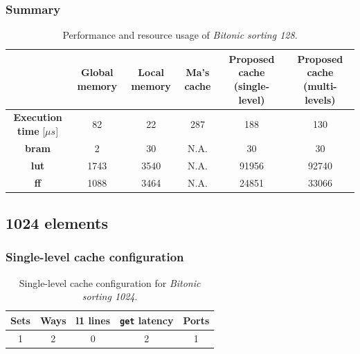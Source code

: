 \documentclass[11pt,a4paper,oneside]{memoir}
\begin{document}
\subsubsection{Summary}
\begin{table}[H]
	\begin{center}
		\begin{tabularx}{\textwidth}{CCCCCC}
			\hline
			& \textbf{Global memory} & \textbf{Local memory} &
			\textbf{Ma's cache} \footnotemark &
			\textbf{Proposed cache (single-level)} &
			\textbf{Proposed cache (multi-levels)} \\
			\hline
			\textbf{Execution time} [$\mu s$] & 82 & 22 & 287 & 188 & 130 \\
			\textbf{\ac{bram}} & 2 & 30 & N.A. & 30 & 30 \\
			\textbf{\acs{lut}} & 1743 & 3540 & N.A. & 91956 & 92740 \\
			\textbf{\acs{ff}} & 1088 & 3464 & N.A. & 24851 & 33066 \\
			\hline
		\end{tabularx}
	\end{center}
	\caption{Performance and resource usage of \emph{Bitonic sorting 128}.}
	\label{tab:bitonic_128_report}
\end{table}


\subsection{1024 elements}
\subsubsection{Single-level cache configuration}
\begin{table}[H]
	\begin{center}
		\begin{tabular}{ccccc}
			\hline
			\rowcolor{gray!50}
			\textbf{Sets} & \textbf{Ways} & \textbf{\ac{l1} lines} &
			\textbf{\texttt{get} latency} & \textbf{Ports} \\
			\hline
			1 & 2 & 0 & 2 & 1 \\
			\hline
		\end{tabular}
	\end{center}
	\caption{Single-level cache configuration for \emph{Bitonic sorting 1024}.}
	\label{tab:bitonic_1024_no_l1_config}
\end{table}
\end{document}
